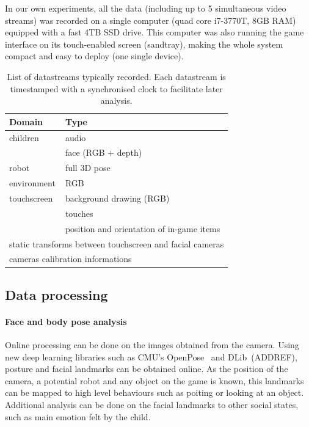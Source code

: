 \documentclass[sigconf]{acmart}
\begin{document}
In our own experiments, all the data (including up to 5 simultaneous video
streams) was recorded on a single computer (quad core i7-3770T, 8GB RAM)
equipped with a fast 4TB SSD drive. This computer was also running the game
interface on its touch-enabled screen (sandtray), making the whole system
compact and easy to deploy (one single device).

\begin{table}[]
\centering
\caption{List of datastreams typically recorded. Each datastream is timestamped
with a synchronised clock to facilitate later analysis.}
\label{table|datastreams}
\begin{tabular}{@{}ll@{}}
\toprule
\bf Domain  & \bf Type                               \\ \midrule
children    & audio                                  \\
            & face (RGB + depth)                     \\
robot       & full 3D pose                           \\
environment & RGB                                    \\
touchscreen & background drawing (RGB)               \\
            & touches                                \\
            & position and orientation of in-game items         \\
 \multicolumn{2}{l}{static transforms between touchscreen and facial cameras} \\
 \multicolumn{2}{l}{cameras calibration informations}                         \\ \bottomrule
\end{tabular}
\end{table}


\subsection{Data processing}

\paragraph{Face and body pose analysis}

Online processing can be done on the images obtained from the camera. Using new
deep learning libraries such as CMU's OpenPose~\cite{cao2017realtime} and
DLib~(ADDREF), posture and facial landmarks can be obtained online. As the
position of the camera, a potential robot and any object on the game is known,
this landmarks can be mapped to high level behaviours such as poiting or looking
at an object. Additional analysis can be done on the facial landmarks to other
social states, such as main emotion felt by the child.
\end{document}
